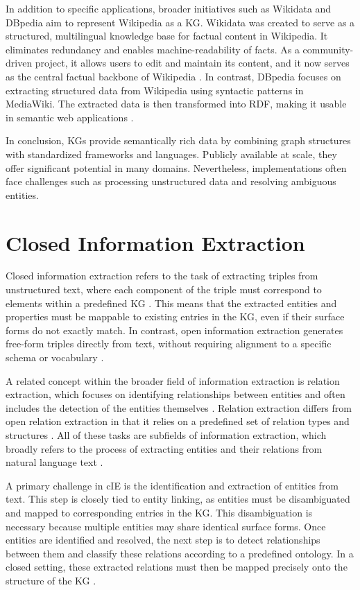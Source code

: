 \documentclass[a4paper,oneside,bibliography=totoc]{scrbook}
\begin{document}
In addition to specific applications, broader initiatives such as Wikidata and DBpedia aim to represent Wikipedia as a \ac{KG}. Wikidata was created to serve as a structured, multilingual knowledge base for factual content in Wikipedia. It eliminates redundancy and enables machine-readability of facts. As a community-driven project, it allows users to edit and maintain its content, and it now serves as the central factual backbone of Wikipedia \cite{Vrandecic2014}. In contrast, DBpedia focuses on extracting structured data from Wikipedia using syntactic patterns in MediaWiki. The extracted data is then transformed into \ac{RDF}, making it usable in semantic web applications \cite{Auer2007}.

In conclusion, \acp{KG} provide semantically rich data by combining graph structures with standardized frameworks and languages. Publicly available at scale, they offer significant potential in many domains. Nevertheless, implementations often face challenges such as processing unstructured data and resolving ambiguous entities.


\section{Closed Information Extraction}
\label{sec:closed_information_extraction}

Closed information extraction refers to the task of extracting triples from unstructured text, where each component of the triple must correspond to elements within a predefined \ac{KG} \cite{Josifoski2021}. This means that the extracted entities and properties must be mappable to existing entries in the \ac{KG}, even if their surface forms do not exactly match. In contrast, open information extraction generates free-form triples directly from text, without requiring alignment to a specific schema or vocabulary \cite{Etzioni2008}.

A related concept within the broader field of information extraction is relation extraction, which focuses on identifying relationships between entities and often includes the detection of the entities themselves \cite{Zhao2024}. Relation extraction differs from open relation extraction in that it relies on a predefined set of relation types and structures \cite{Kamp2023}. All of these tasks are subfields of information extraction, which broadly refers to the process of extracting entities and their relations from natural language text \cite{Etzioni2008}.

A primary challenge in \ac{cIE} is the identification and extraction of entities from text. This step is closely tied to entity linking, as entities must be disambiguated and mapped to corresponding entries in the \ac{KG}. This disambiguation is necessary because multiple entities may share identical surface forms. Once entities are identified and resolved, the next step is to detect relationships between them and classify these relations according to a predefined ontology. In a closed setting, these extracted relations must then be mapped precisely onto the structure of the \ac{KG} \cite{Josifoski2021,Zhao2024}.
\end{document}
